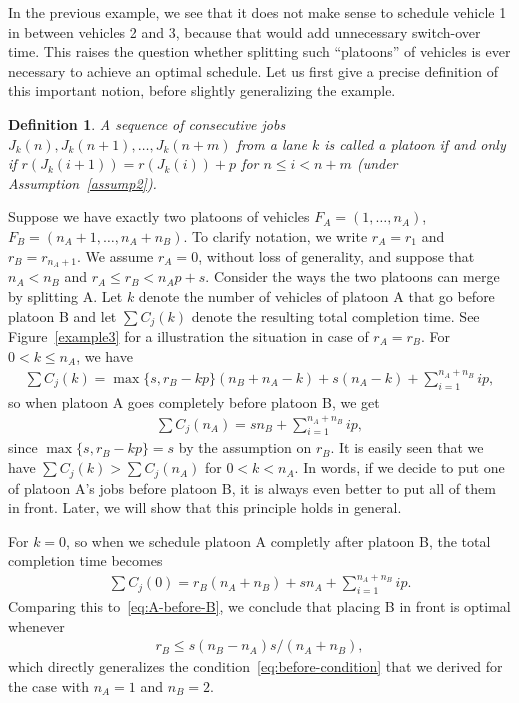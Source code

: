 \documentclass{article}
\theoremstyle{definition}
\theoremstyle{plain}
\newtheorem{define}{Definition}[section]
\begin{document}
In the previous example, we see that it does not make sense to schedule vehicle
1 in between vehicles 2 and 3, because that would add unnecessary switch-over
time. This raises the question whether splitting such ``platoons'' of vehicles
is ever necessary to achieve an optimal schedule. Let us first give a precise
definition of this important notion, before slightly generalizing the example.
%
\begin{define}
  A sequence of consecutive jobs $J_{k}(n), J_{k}(n+1), \dots, J_{k}(n+m)$ from
  a lane $k$ is called a {\normalfont platoon} if and only if $r(J_{k}(i+1)) = r(J_{k}(i)) + p$ for
  $n \leq i < n + m$ (under Assumption~\ref{assump2}).
\end{define}
%
\begin{eg}
  \label{example3}
  Suppose we have exactly two platoons of vehicles $F_{A} = (1, \dots, n_{A})$,
  $F_{B} = (n_{A} + 1, \dots, n_{A} + n_{B})$. To clarify notation, we write
  $r_{A} = r_{1}$ and $r_{B} = r_{n_{A} + 1}$. We assume $r_{A} = 0$, without
  loss of generality, and suppose that $n_{A} < n_{B}$ and
  $r_{A} \leq r_{B} < n_{A}p + s$. Consider the ways the two platoons can merge
  by splitting A. Let $k$ denote the number of vehicles of platoon A that go
  before platoon B and let $\sum C_{j}(k)$ denote the resulting total completion
  time. See Figure~\ref{example3} for a illustration the situation in case of
  $r_{A} = r_{B}$. For $0 < k \leq n_{A}$, we have
  \begin{align*}
    \sum C_{j} (k) = \max\{ s, r_{B} - kp\} (n_{B} + n_{A} - k) + s (n_{A} - k) + \sum_{i=1}^{n_{A}+n_{B}} ip ,
  \end{align*}
  so when platoon A goes completely before platoon B, we get
  \begin{align}
    \sum C_{j} (n_{A}) = s n_{B} + \sum_{i=1}^{n_{A}+n_{B}} ip ,
    \label{eq:A-before-B}
  \end{align}
  since $\max\{ s, r_{B} - kp \} = s$ by the assumption on $r_{B}$. It is easily
  seen that we have $\sum C_{j}(k) > \sum C_{j} (n_{A})$ for $0 < k < n_{A}$. In
  words, if we decide to put one of platoon A's jobs before platoon B, it is
  always even better to put all of them in front. Later, we will show that this
  principle holds in general.

  For $k=0$, so when we schedule platoon A completly after platoon B, the total
  completion time becomes
  \begin{align*}
    \sum C_{j} (0) = r_{B} (n_{A} + n_{B}) + s n_{A} + \sum_{i=1}^{n_{A}+n_{B}} ip .
  \end{align*}
  Comparing this to~\eqref{eq:A-before-B}, we conclude that placing B in front
  is optimal whenever
  \begin{align*}
    r_{B} \leq s (n_{B} - n_{A}) s / (n_{A} + n_{B}) ,
  \end{align*}
  which directly generalizes the condition~\eqref{eq:before-condition} that we
  derived for the case with $n_{A} = 1$ and $n_{B} = 2$.
\end{eg}
\end{document}
